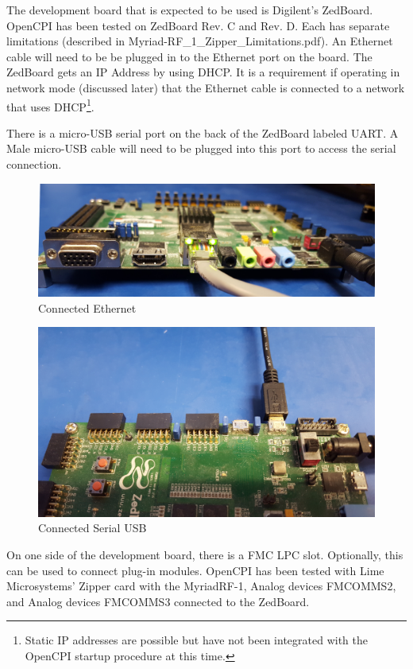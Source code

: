 \begin{flushleft}
The development board that is expected to be used is Digilent's ZedBoard. OpenCPI has been tested on ZedBoard Rev. C and Rev. D. Each has separate limitations (described in Myriad-RF\_1\_Zipper\_Limitations.pdf). An Ethernet cable will need to be be plugged in to the Ethernet port on the board.  The ZedBoard gets an IP Address by using DHCP.  It is a requirement if operating in network mode (discussed later) that the Ethernet cable is connected to a network that uses DHCP\footnote{Static IP addresses are possible but have not been integrated with the OpenCPI startup procedure at this time.}.  \\ \bigskip

There is a micro-USB serial port on the back of the ZedBoard labeled UART. A Male micro-USB cable will need to be plugged into this port to access the serial connection.
\begin{figure}[ht]
	\centerline{\includegraphics[scale=0.05]{zed_ether}}
	\caption{Connected Ethernet}
	\label{fig:zed_ether}
\end{figure}
\begin{figure}[ht]
	\centerline{\includegraphics[scale=0.05]{zed_uart}}
	\caption{Connected Serial USB}
	\label{fig:zed_uart}
\end{figure}

\newpage
On one side of the development board, there is a FMC LPC slot. Optionally, this can be used to connect plug-in modules. OpenCPI has been tested with Lime Microsystems' Zipper card with the MyriadRF-1, Analog devices FMCOMMS2, and Analog devices FMCOMMS3 connected to the ZedBoard.\\   \bigskip


\end{flushleft}
